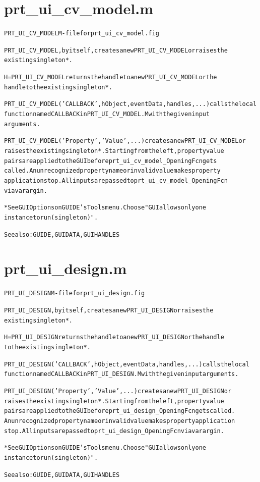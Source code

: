 \section{prt\_ui\_cv\_model.m}
\begin{alltt}

 PRT\_UI\_CV\_MODEL M-file for prt\_ui\_cv\_model.fig
 
 PRT\_UI\_CV\_MODEL, by itself, creates a new PRT\_UI\_CV\_MODEL or raises the
 existing singleton*.
 
 H = PRT\_UI\_CV\_MODEL returns the handle to a new PRT\_UI\_CV\_MODEL or the
 handle to the existing singleton*.
 
 PRT\_UI\_CV\_MODEL('CALLBACK',hObject,eventData,handles,...) calls the local
 function named CALLBACK in PRT\_UI\_CV\_MODEL.M with the given input
 arguments.
 
 PRT\_UI\_CV\_MODEL('Property','Value',...) creates a new PRT\_UI\_CV\_MODEL or
 raises the existing singleton*.  Starting from the left, property value
 pairs are applied to the GUI before prt\_ui\_cv\_model\_OpeningFcn gets
 called. An unrecognized property name or invalid value makes property
 application stop.  All inputs are passed to prt\_ui\_cv\_model\_OpeningFcn
 via varargin.
 
 *See GUI Options on GUIDE's Tools menu.  Choose "GUI allows only one
  instance to run (singleton)".
 
 See also: GUIDE, GUIDATA, GUIHANDLES
\end{alltt}


\section{prt\_ui\_design.m}
\begin{alltt}

 PRT\_UI\_DESIGN M-file for prt\_ui\_design.fig
 
 PRT\_UI\_DESIGN, by itself, creates a new PRT\_UI\_DESIGN or raises the 
 existing singleton*.
 
 H = PRT\_UI\_DESIGN returns the handle to a new PRT\_UI\_DESIGN or the handle
 to the existing singleton*.
 
 PRT\_UI\_DESIGN('CALLBACK',hObject,eventData,handles,...) calls the local
 function named CALLBACK in PRT\_UI\_DESIGN.M with the given input arguments.
 
 PRT\_UI\_DESIGN('Property','Value',...) creates a new PRT\_UI\_DESIGN or 
 raises the existing singleton*.  Starting from the left, property value 
 pairs are applied to the GUI before prt\_ui\_design\_OpeningFcn gets called.
 An unrecognized property name or invalid value makes property application
 stop.  All inputs are passed to prt\_ui\_design\_OpeningFcn via varargin.
 
 *See GUI Options on GUIDE's Tools menu.  Choose "GUI allows only one
  instance to run (singleton)".
 
 See also: GUIDE, GUIDATA, GUIHANDLES
\end{alltt}


